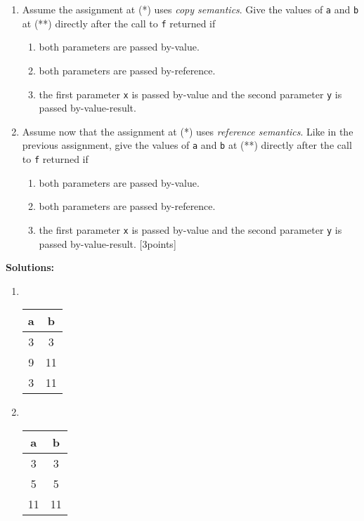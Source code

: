 \documentclass{article}
\newcommand{\solution}[1] {\textbf{Solutions:}\\ #1}
\newcommand{\comment}[1]{\marginpar{#1}}
\begin{document}
\begin{enumerate}
\item \comment{\textbf{[3 points]}} Assume the assignment at (*) uses
  \emph{copy semantics}. Give the values of \texttt{a} and \texttt{b}
  at (**) directly after the call to \texttt{f} returned if
  \begin{enumerate}
  \item both parameters are passed by-value.
  \item both parameters are passed by-reference.
  \item the first parameter \texttt{x} is passed by-value and the
    second parameter \texttt{y} is passed by-value-result.
  \end{enumerate} 
\item \comment{\textbf{[3 points]}} Assume now that the assignment
  at (*) uses \emph{reference semantics}. Like in the previous
  assignment, give the values of \texttt{a} and \texttt{b} at (**)
  directly after the call to \texttt{f} returned if
  \begin{enumerate}
  \item both parameters are passed by-value.
  \item both parameters are passed by-reference.
  \item the first parameter \texttt{x} is passed by-value and the
    second parameter \texttt{y} is passed by-value-result. [3points]
  \end{enumerate} 
\end{enumerate}

\solution{
\begin{enumerate}
  \item \hfill \\
  \begin{tabular}{cc}
    a & b \\ \hline
    3 & 3 \\
    9 & 11\\
    3 & 11     
  \end{tabular}

  \item \hfill \\
  \begin{tabular}{cc}
    a & b \\ \hline
    3 & 3 \\
    5 & 5\\
    11 & 11 \\     
  \end{tabular}
\end{enumerate}
}
\end{document}

